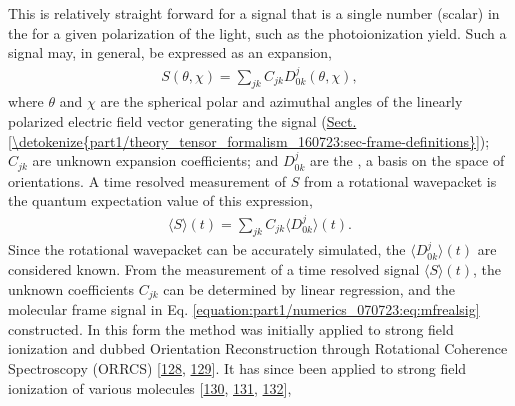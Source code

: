 \documentclass[letterpaper,table,10pt,english]{jupyterBook}
\begin{document}
\sphinxAtStartPar
This is relatively straight forward for a signal that is a single number (scalar) in the {\hyperref[\detokenize{backmatter/glossary:term-MF}]{}} for a given polarization of the light, such as the photoionization yield. Such a signal may, in general, be expressed as an expansion,
\begin{equation}\label{equation:part1/numerics_070723:eq:mfrealsig}
\begin{split}
S(\theta,\chi)=\sum_{jk}C_{jk}D^{j}_{0k}(\theta,\chi),
\end{split}
\end{equation}
\sphinxAtStartPar
where \(\theta\) and \(\chi\) are the {\hyperref[\detokenize{backmatter/glossary:term-MF}]{}} spherical polar and azimuthal angles of the linearly polarized electric field vector generating the signal (\hyperref[\detokenize{part1/theory_tensor_formalism_160723:sec-frame-definitions}]{Sect.\@ \ref{\detokenize{part1/theory_tensor_formalism_160723:sec-frame-definitions}}}); \(C_{jk}\) are unknown expansion coefficients; and \(D^{j}_{0k}\) are the {\hyperref[\detokenize{backmatter/glossary:term-Wigner-rotation-matrix-elements}]{}}, a basis on the space of orientations. A time resolved measurement of \(S\) from a rotational wavepacket is the quantum expectation value of this expression,
\begin{equation}\label{equation:part1/numerics_070723:eq:St-Cjk}
\begin{split}
\langle S \rangle(t) = \sum_{jk}C_{jk}\langle D^{j}_{0k} \rangle (t).
\end{split}
\end{equation}
\sphinxAtStartPar
Since the rotational wavepacket can be accurately simulated, the \(\langle D^{j}_{0k} \rangle (t)\) are considered known. From the measurement of a time resolved signal \(\langle S \rangle(t)\), the unknown coefficients \(C_{jk}\) can be determined by linear regression, and the molecular frame signal in Eq. \eqref{equation:part1/numerics_070723:eq:mfrealsig} constructed. In this form the method was initially applied to strong field ionization and dubbed Orientation Reconstruction through Rotational Coherence Spectroscopy (ORRCS) {[}\hyperlink{cite.backmatter/bibliography:id994}{128}, \hyperlink{cite.backmatter/bibliography:id993}{129}{]}.
It has since been applied to strong field ionization of various molecules {[}\hyperlink{cite.backmatter/bibliography:id995}{130}, \hyperlink{cite.backmatter/bibliography:id996}{131}, \hyperlink{cite.backmatter/bibliography:id999}{132}{]},
\end{document}
